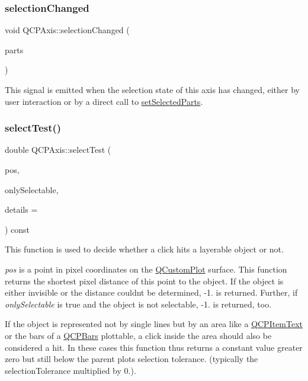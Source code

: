 \subsubsection{\texorpdfstring{selection\+Changed}{selectionChanged}}
{\footnotesize\ttfamily void Q\+C\+P\+Axis\+::selection\+Changed (\begin{DoxyParamCaption}\item[{const Q\+C\+P\+Axis\+::\+Selectable\+Parts \&}]{parts }\end{DoxyParamCaption})\hspace{0.3cm}{\ttfamily [signal]}}

This signal is emitted when the selection state of this axis has changed, either by user interaction or by a direct call to \hyperlink{classQCPAxis_ab9d7a69277dcbed9119b3c1f25ca19c3}{set\+Selected\+Parts}. \mbox{\label{classQCPAxis_a63b7103c57fe9acfbce164334ea837f8}} 
\subsubsection{\texorpdfstring{select\+Test()}{selectTest()}}
{\footnotesize\ttfamily double Q\+C\+P\+Axis\+::select\+Test (\begin{DoxyParamCaption}\item[{const Q\+PointF \&}]{pos,  }\item[{bool}]{only\+Selectable,  }\item[{Q\+Variant $\ast$}]{details = {} }\end{DoxyParamCaption}) const\hspace{0.3cm}{\ttfamily [virtual]}}

This function is used to decide whether a click hits a layerable object or not.

{\itshape pos} is a point in pixel coordinates on the \hyperlink{classQCustomPlot}{Q\+Custom\+Plot} surface. This function returns the shortest pixel distance of this point to the object. If the object is either invisible or the distance couldn\textquotesingle{}t be determined, -\/1. is returned. Further, if {\itshape only\+Selectable} is true and the object is not selectable, -\/1. is returned, too.

If the object is represented not by single lines but by an area like a \hyperlink{classQCPItemText}{Q\+C\+P\+Item\+Text} or the bars of a \hyperlink{classQCPBars}{Q\+C\+P\+Bars} plottable, a click inside the area should also be considered a hit. In these cases this function thus returns a constant value greater zero but still below the parent plot\textquotesingle{}s selection tolerance. (typically the selection\+Tolerance multiplied by 0.).

